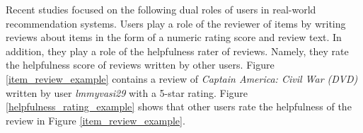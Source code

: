 \documentclass[master,english,final]{kaist-ucs}
\begin{document}
Recent studies \cite{RQMF,DualRole} focused on the following dual roles of users in real-world recommendation systems.
Users play a role of the reviewer of items by writing reviews about items in the form of a numeric rating score and review text. 
In addition, they play a role of the helpfulness rater of reviews.
Namely, they rate the helpfulness score of reviews written by other users.
Figure \ref{item_review_example} contains a review of \textit{Captain America: Civil War (DVD)} written by user \textit{lmmyvasi29} with a 5-star rating.
Figure \ref{helpfulness_rating_example} shows that other users rate the helpfulness of the review in Figure \ref{item_review_example}.
\end{document}
